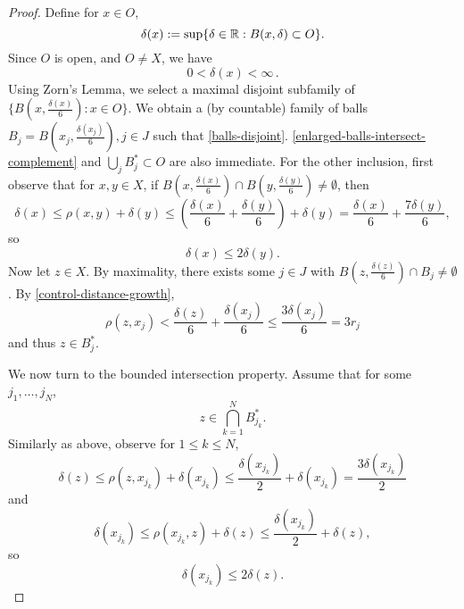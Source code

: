 \begin{proof}
Define for $x\in O$,
\begin{equation}
    \delta(x):= \sup \{\delta\in{\mathbb{R}} : B(x,\delta)\subset O\}.
\end{equation}
Since $O$ is open, and $O\ne X$, we have
\begin{equation}
    0 < \delta(x) < \infty \,.
\end{equation}
Using Zorn's Lemma, we select a maximal disjoint subfamily of $\{B(x,\frac{\delta(x)}{6}) : x \in O\}$.
We obtain a (by  countable) family of balls $B_j = B(x_j, \frac{\delta(x_j)}{6}), j \in J$ such that \eqref{balls-disjoint}. \eqref{enlarged-balls-intersect-complement} and $\bigcup_j B_j^* \subset O$ are also immediate. For the other inclusion, first observe that for $x,y\in X$,  if $B(x,\frac{\delta(x)}{6}) \cap B(y,\frac{\delta(y)}{6}) \ne \emptyset$, then
\begin{equation*}
    \delta(x) \le \rho(x,y) + \delta(y) \le (\frac{\delta(x)}{6} + \frac{\delta(y)}{6}) + \delta(y) = \frac{\delta(x)}{6} + \frac{7\delta(y)}{6},
\end{equation*}
so
\begin{equation}
    \label{control-distance-growth}
    \delta(x) \le 2 \delta(y).
\end{equation}
Now let $z\in X$. By maximality, there exists some $j\in J$ with $B(z,\frac{\delta(z)}{6}) \cap B_j \ne \emptyset$. By \eqref{control-distance-growth},
\begin{equation*}
    \rho(z,x_j)< \frac{\delta(z)}{6} + \frac{\delta(x_j)}{6} \le \frac{3\delta(x_j)}{6} = 3r_j
\end{equation*}
and thus $z\in B_j^*$.

We now turn to the bounded intersection property. Assume that for some $j_1,\dots,j_N$,
\begin{equation}
    z\in \bigcap_{k=1}^N B_{j_k}^*.
\end{equation}
Similarly as above, observe for $1\le k \le N$,
\begin{equation}
    \label{control-distance-growth-b}
    \delta(z) \le \rho(z,x_{j_k}) + \delta(x_{j_k}) \le \frac{\delta(x_{j_k})}{2} + \delta(x_{j_k}) = \frac{3\delta(x_{j_k})}{2}
\end{equation}
and
\begin{equation*}
    \delta(x_{j_k}) \le \rho(x_{j_k},z) + \delta(z) \le \frac{\delta(x_{j_k})}{2} + \delta(z),
\end{equation*}
so
\begin{equation}
    \label{control-distance-growth-c}
    \delta(x_{j_k}) \le 2 \delta(z).
\end{equation}


\end{proof}
